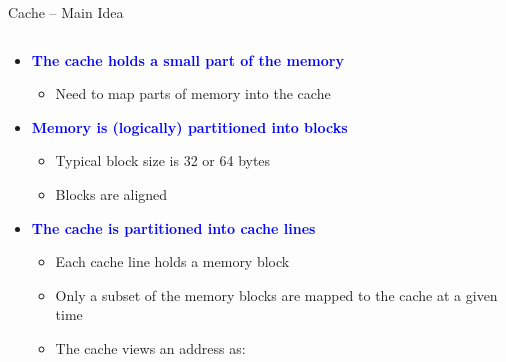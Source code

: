 \documentclass[aspectratio=169,12pt]{beamer}
\begin{document}
\begin{frame}{Cache -- Main Idea}
\begin{columns}[T]
\begin{column}{0.65\textwidth}
\begin{itemize}
  \item \textcolor{blue}{\textbf{The cache holds a small part of the memory}}
  \begin{itemize}
    \item Need to map parts of memory into the cache
  \end{itemize}
  
  \item \textcolor{blue}{\textbf{Memory is (logically) partitioned into blocks}}
  \begin{itemize}
    \item Typical block size is 32 or 64 bytes
    \item Blocks are aligned
  \end{itemize}
  
  \item \textcolor{blue}{\textbf{The cache is partitioned into cache lines}}
  \begin{itemize}
    \item Each cache line holds a memory block
    \item Only a subset of the memory blocks are mapped to the cache at a given time
    \item The cache views an address as:
  \end{itemize}
\end{itemize}

\vspace{0.2cm}
\begin{center}
\end{center}
\end{column}


\end{columns}
\end{frame}
\end{document}
